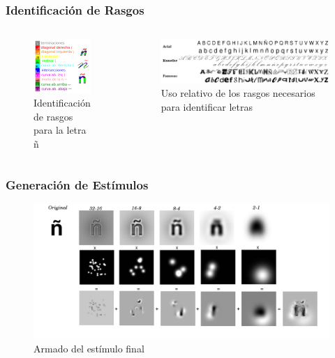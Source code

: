 \documentclass[10pt]{beamer}
\begin{document}
	\begin{frame}
	\frametitle{Identificaci\'on de Rasgos}
	\begin{columns} [t]
	\begin{figure}
	\includegraphics[width=.8\textwidth]{graficos/REFERENCIA.png}
	\caption{Identificaci\'on de rasgos para la letra \~n}
	\end{figure}
	\begin{figure}
	\includegraphics[width=.5\textwidth]{graficos/letras.png}
	\caption{Uso relativo de los rasgos necesarios para identificar letras}
	\end{figure}
	\end{columns}
	\end{frame}

	\begin{frame}
	\frametitle{Generaci\'on de Est\'imulos}
	    \begin{figure}
	    \includegraphics[width=\textwidth]{graficos/estimulofinal.png}
	    \caption{Armado del est\'imulo final}
	    \end{figure}
	\end{frame}
\end{document}
